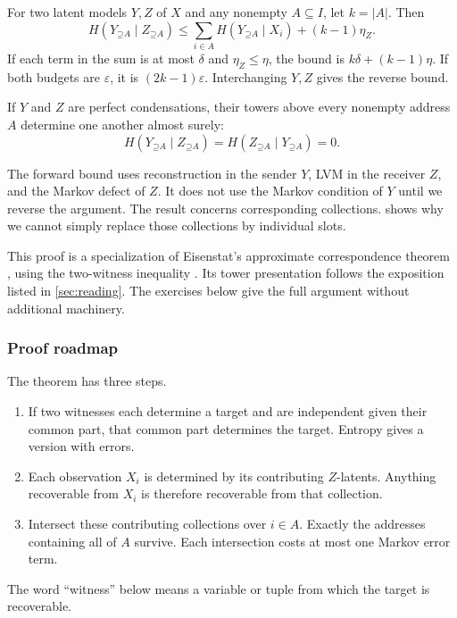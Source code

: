\documentclass[11pt]{article}
\newcommand{\Up}{\mathord{\supseteq}}
\begin{document}
\begin{theorem}[Correspondence]
\label{thm:correspondence}
For two latent models $Y,Z$ of $X$ and any nonempty $A\subseteq I$, let
$k=|A|$. Then
\begin{equation}
 H(Y_{\Up A}\mid Z_{\Up A})
 \le \sum_{i\in A}H(Y_{\Up A}\mid X_i)+(k-1)\eta_Z.
 \label{eq:correspondence}
\end{equation}
If each term in the sum is at most $\delta$ and $\eta_Z\le\eta$, the bound
is $k\delta+(k-1)\eta$. If both budgets are $\varepsilon$, it is
$(2k-1)\varepsilon$. Interchanging $Y,Z$ gives the reverse bound.
\end{theorem}

\begin{corollary}
\label{cor:exact}
If $Y$ and $Z$ are perfect condensations, their towers above every nonempty
address $A$ determine one another almost surely:
\[
 H(Y_{\Up A}\mid Z_{\Up A})=H(Z_{\Up A}\mid Y_{\Up A})=0.
\]
\end{corollary}

The forward bound uses reconstruction in the sender $Y$, LVM in the receiver
$Z$, and the Markov defect of $Z$.
It does not use the Markov condition of $Y$ until we reverse the argument.
The result concerns corresponding collections.  shows why we cannot simply
replace those collections by individual slots.

This proof is a specialization of Eisenstat's approximate correspondence
theorem \citep[Theorem~6.8]{eisenstat2025condensation}, using the two-witness
inequality \citep[Lemma~6.4]{eisenstat2025condensation}.
Its tower presentation follows the exposition listed in \cref{sec:reading}.
The exercises below give the full argument without additional machinery.

\subsubsection{Proof roadmap}
The theorem has three steps.
\begin{enumerate}
\item If two witnesses each determine a target and are independent given their
common part, that common part determines the target. Entropy gives a version
with errors.
\item Each observation $X_i$ is determined by its contributing $Z$-latents.
Anything recoverable from $X_i$ is therefore recoverable from that collection.
\item Intersect these contributing collections over $i\in A$. Exactly the
addresses containing all of $A$ survive. Each intersection costs at most one
Markov error term.
\end{enumerate}
The word ``witness'' below means a variable or tuple from which the target is
recoverable.
\end{document}
